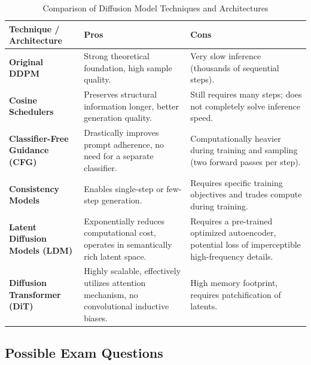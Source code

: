 \begin{table}[h]
\centering
\begin{tabularx}{\textwidth}{| >{\centering\arraybackslash}m{3.5cm} | X | X |}
\hline
\textbf{Technique / Architecture} & \textbf{Pros} & \textbf{Cons} \\
\hline
\textbf{Original DDPM} & Strong theoretical foundation, high sample quality. & Very slow inference (thousands of sequential steps). \\
\hline
\textbf{Cosine Schedulers} & Preserves structural information longer, better generation quality. & Still requires many steps; does not completely solve inference speed. \\
\hline
\textbf{Classifier-Free Guidance (CFG)} & Drastically improves prompt adherence, no need for a separate classifier. & Computationally heavier during training and sampling (two forward passes per step). \\
\hline
\textbf{Consistency Models} & Enables single-step or few-step generation. & Requires specific training objectives and trades compute during training. \\
\hline
\textbf{Latent Diffusion Models (LDM)} & Exponentially reduces computational cost, operates in semantically rich latent space. & Requires a pre-trained optimized autoencoder, potential loss of imperceptible high-frequency details. \\
\hline
\textbf{Diffusion Transformer (DiT)} & Highly scalable, effectively utilizes attention mechanism, no convolutional inductive biases. & High memory footprint, requires patchification of latents. \\
\hline
\end{tabularx}
\caption{Comparison of Diffusion Model Techniques and Architectures}
\label{tab:diffusion_comparison}
\end{table}

\subsection{Possible Exam Questions}

